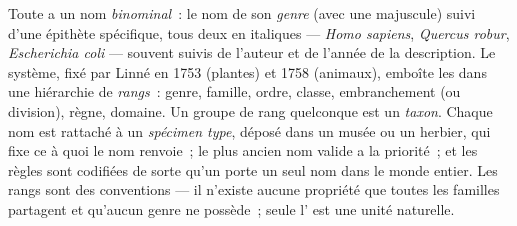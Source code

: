 \begin{definition}\label{def:b1:classifying-biodiversity:nomenclature}
Toute  a un nom \emph{binominal}~: le nom de son \emph{genre}
(avec une majuscule) suivi d'une épithète spécifique, tous deux en
italiques --- \emph{Homo sapiens}, \emph{Quercus robur},
\emph{Escherichia coli} --- souvent suivis de l'auteur et de l'année de
la description. Le système, fixé par Linné en 1753 (plantes) et
1758 (animaux), emboîte les  dans une hiérarchie de \emph{rangs}~:
genre, famille, ordre, classe, embranchement (ou division), règne,
domaine. Un groupe de rang quelconque est un \emph{taxon}. Chaque nom
est rattaché à un \emph{spécimen type}, déposé dans un musée ou un
herbier, qui fixe ce à quoi le nom renvoie~; le plus ancien nom valide a
la priorité~; et les règles sont codifiées de sorte qu'un 
porte un seul nom dans le monde entier. Les rangs sont des conventions
--- il n'existe aucune propriété que toutes les familles partagent et
qu'aucun genre ne possède~; seule l' est une unité naturelle.
\end{definition}

